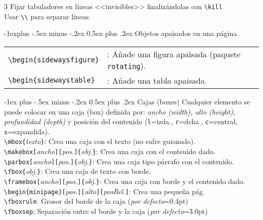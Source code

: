 \documentclass[10pt,landscape,a4paper]{article}
\makeatletter
\renewcommand{\section}{\@startsection{section}{1}{0mm}%
                                {-1ex plus -.5ex minus -.2ex}%
                                {0.5ex plus .2ex}%
                                {\normalfont\large\bfseries}}
\renewcommand{\subsection}{\@startsection{subsection}{2}{0mm}%
                                {-1explus -.5ex minus -.2ex}%
                                {0.5ex plus .2ex}%
                                {\normalfont\normalsize\bfseries}}
\makeatother
\begin{document}
\begin{multicols}{3}
Fijar tabuladores en líneas <<invisibles>> finalizándolas con \verb!\kill!\\
Usar \verb!\\! para separar líneas.




\subsection{Objetos apaisados en una página}
\begin{tabular}{@{}p{30ex}%
		@{}p{\linewidth-30ex}@{}}
	\verb!\begin{sidewaysfigure}!    &:  Añade una figura apaisada (paquete \texttt{rotating}).\\
	\verb!\begin{sidewaystable}!     &:  Añade una tabla apaisada. \\
\end{tabular}
 




\section{Cajas (boxes)}
 Cualquier elemento se puede colocar en una caja (box) definida por: \emph{ancho (width), alto (height), profundidad (depth)} y posición del contenido (\texttt{l}=izda., \texttt{r}=dcha., \texttt{c}=central, \texttt{s}=expandida).\\[0.7mm]
 
\verb!\mbox{!\emph{texto}\verb!}!: Crea una caja con el texto (no sufre guionado).\\
\verb!\makebox[!\emph{ancho}\verb!][!\emph{pos.}\verb!]{!\emph{obj.}\verb!}!: Crea una caja con el contenido dado.\\
\verb!\parbox[!\emph{ancho}\verb!][!\emph{pos.}\verb!]{!\emph{obj.}\verb!}!: Crea una caja tipo párrafo con el contenido.\\
\verb!\fbox{!\emph{obj.}\verb!}!: Crea una caja de texto con borde.\\
\verb!\framebox[!\emph{ancho}\verb!][!\emph{pos.}\verb!]{!\emph{obj.}\verb!}!: Crea una caja con borde y el contenido dado.\\
\verb!\begin{minipage}[!\emph{pos.}\verb!][!\emph{alto}\verb!][!\emph{posRel.}\verb!]!: Crea una pequeña pág.\\
\verb!\fboxrule!: Grosor del borde de la caja (\emph{por defecto}=0.4pt)\\
\verb!\fboxsep!: Separación entre el borde y la caja (\emph{por defecto}=3.0pt)\\[0.7mm]





\end{multicols}
\end{document}
